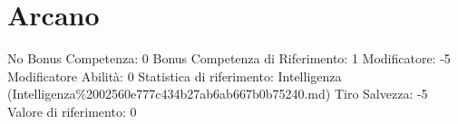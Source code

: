 \section{Arcano}\label{arcano}

\begin{description}
\tightlist
\item[Tags: ABI]
No Bonus Competenza: 0 Bonus Competenza di Riferimento: 1 Modificatore:
-5 Modificatore Abilità: 0 Statistica di riferimento: Intelligenza
(Intelligenza\%2002560e777c434b27ab6ab667b0b75240.md) Tiro Salvezza: -5
Valore di riferimento: 0
\end{description}
